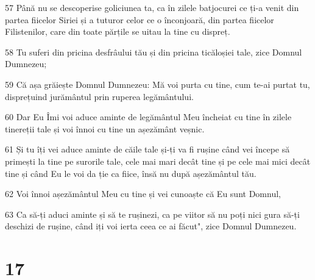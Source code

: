 \par 57 Până nu se descoperise goliciunea ta, ca în zilele batjocurei ce ți-a venit din partea fiicelor Siriei și a tuturor celor ce o înconjoară, din partea fiicelor Filistenilor, care din toate părțile se uitau la tine cu dispreț.
\par 58 Tu suferi din pricina desfrâului tău și din pricina ticăloșiei tale, zice Domnul Dumnezeu;
\par 59 Că așa grăiește Domnul Dumnezeu: Mă voi purta cu tine, cum te-ai purtat tu, disprețuind jurământul prin ruperea legământului.
\par 60 Dar Eu Îmi voi aduce aminte de legământul Meu încheiat cu tine în zilele tinereții tale și voi înnoi cu tine un așezământ veșnic.
\par 61 Și tu îți vei aduce aminte de căile tale și-ți va fi rușine când vei începe să primești la tine pe surorile tale, cele mai mari decât tine și pe cele mai mici decât tine și când Eu le voi da ție ca fiice, însă nu după așezământul tău.
\par 62 Voi înnoi așezământul Meu cu tine și vei cunoaște că Eu sunt Domnul,
\par 63 Ca să-ți aduci aminte și să te rușinezi, ca pe viitor să nu poți nici gura să-ți deschizi de rușine, când iți voi ierta ceea ce ai făcut", zice Domnul Dumnezeu.

\chapter{17}

